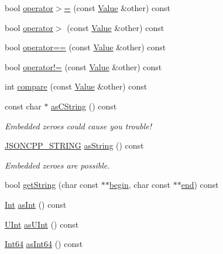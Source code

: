 \begin{DoxyCompactItemize}
\item 
bool \hyperlink{class_json_1_1_value_afe2c3e52df60b9622cbd8358b74bdbf5}{operator$>$=} (const \hyperlink{class_json_1_1_value}{Value} \&other) const
\item 
bool \hyperlink{class_json_1_1_value_a4646c2f0764908c0972160c7c2ebe567}{operator$>$} (const \hyperlink{class_json_1_1_value}{Value} \&other) const
\item 
bool \hyperlink{class_json_1_1_value_a16f9250e30d5c4505cd11137c564a764}{operator==} (const \hyperlink{class_json_1_1_value}{Value} \&other) const
\item 
bool \hyperlink{class_json_1_1_value_a86e95be072e515c48abc61dec63a1689}{operator!=} (const \hyperlink{class_json_1_1_value}{Value} \&other) const
\item 
int \hyperlink{class_json_1_1_value_aefa4464ca1bb0bcc9a87b38ed62ca2e0}{compare} (const \hyperlink{class_json_1_1_value}{Value} \&other) const
\item 
const char $\ast$ \hyperlink{class_json_1_1_value_a3cd4875a041f3fe12c9b6a5af768d669}{as\+C\+String} () const
\begin{DoxyCompactList}\small\item\em Embedded zeroes could cause you trouble! \end{DoxyCompactList}\item 
\hyperlink{config_8h_a1e723f95759de062585bc4a8fd3fa4be}{J\+S\+O\+N\+C\+P\+P\+\_\+\+S\+T\+R\+I\+NG} \hyperlink{class_json_1_1_value_ae3f9b0d38f820ccdd8888aa92ea6e792}{as\+String} () const
\begin{DoxyCompactList}\small\item\em Embedded zeroes are possible. \end{DoxyCompactList}\item 
bool \hyperlink{class_json_1_1_value_a2e1b7be6bde2fe23f15290d9ddbbdf8a}{get\+String} (char const $\ast$$\ast$\hyperlink{class_json_1_1_value_a015459a3950c198d63a2d3be8f5ae296}{begin}, char const $\ast$$\ast$\hyperlink{class_json_1_1_value_a3e443cd0ef24f7e028b175e47ee045e0}{end}) const
\item 
\hyperlink{class_json_1_1_value_abdf7a7ff73eb130ffcab28504ffdb405}{Int} \hyperlink{class_json_1_1_value_a84b5e68092217af6b7fc6d256ef232c1}{as\+Int} () const
\item 
\hyperlink{class_json_1_1_value_a0933d59b45793ae4aade1757c322a98d}{U\+Int} \hyperlink{class_json_1_1_value_adc7664c2bd414766050eb3fe0eec5232}{as\+U\+Int} () const
\item 
\hyperlink{class_json_1_1_value_a1b86af9f85f0f1baa972c3319fa22695}{Int64} \hyperlink{class_json_1_1_value_af7371262e51d5c564908f5aa684516d1}{as\+Int64} () const

\end{DoxyCompactItemize}
